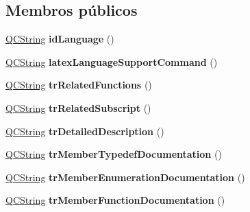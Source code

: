 \subsection*{Membros públicos}
\begin{DoxyCompactItemize}
\item 
\hypertarget{class_translator_croatian_a7de89df4aaf34700ff3db1d056a4f267}{\hyperlink{class_q_c_string}{Q\-C\-String} {\bfseries id\-Language} ()}\label{class_translator_croatian_a7de89df4aaf34700ff3db1d056a4f267}

\item 
\hypertarget{class_translator_croatian_a0348bf1d3055ce6a48cf5f68f6fce2c1}{\hyperlink{class_q_c_string}{Q\-C\-String} {\bfseries latex\-Language\-Support\-Command} ()}\label{class_translator_croatian_a0348bf1d3055ce6a48cf5f68f6fce2c1}

\item 
\hypertarget{class_translator_croatian_a577fc586e534023ef1529208518a994e}{\hyperlink{class_q_c_string}{Q\-C\-String} {\bfseries tr\-Related\-Functions} ()}\label{class_translator_croatian_a577fc586e534023ef1529208518a994e}

\item 
\hypertarget{class_translator_croatian_ab75e972b3134554de11b07bd64127b78}{\hyperlink{class_q_c_string}{Q\-C\-String} {\bfseries tr\-Related\-Subscript} ()}\label{class_translator_croatian_ab75e972b3134554de11b07bd64127b78}

\item 
\hypertarget{class_translator_croatian_abbd0ae4fd49dd1e88f99e03dd19d4e35}{\hyperlink{class_q_c_string}{Q\-C\-String} {\bfseries tr\-Detailed\-Description} ()}\label{class_translator_croatian_abbd0ae4fd49dd1e88f99e03dd19d4e35}

\item 
\hypertarget{class_translator_croatian_a95ba3c5f2554643a7dc0f3408c2b493d}{\hyperlink{class_q_c_string}{Q\-C\-String} {\bfseries tr\-Member\-Typedef\-Documentation} ()}\label{class_translator_croatian_a95ba3c5f2554643a7dc0f3408c2b493d}

\item 
\hypertarget{class_translator_croatian_acfa422f286e43d1d5c893475aca1e757}{\hyperlink{class_q_c_string}{Q\-C\-String} {\bfseries tr\-Member\-Enumeration\-Documentation} ()}\label{class_translator_croatian_acfa422f286e43d1d5c893475aca1e757}

\item 
\hypertarget{class_translator_croatian_aea34608536223538051d2155ff75e05e}{\hyperlink{class_q_c_string}{Q\-C\-String} {\bfseries tr\-Member\-Function\-Documentation} ()}\label{class_translator_croatian_aea34608536223538051d2155ff75e05e}


\end{DoxyCompactItemize}
